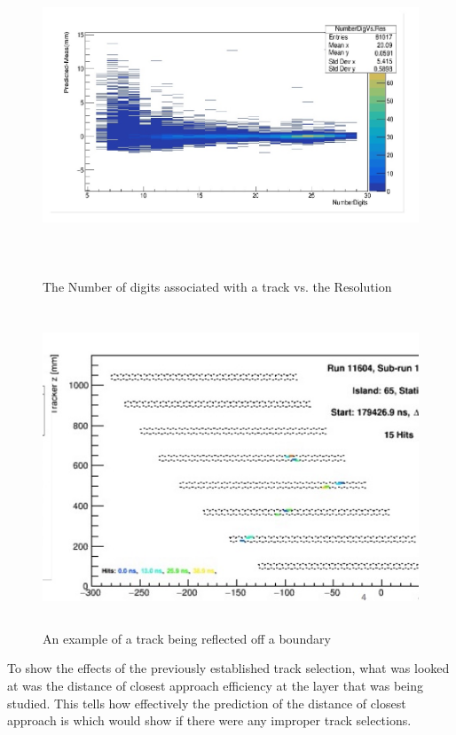 \documentclass[./Thesis]{subfiles}
\begin{document}
\begin{figure}
	\centerline{\includegraphics[height=95mm]{NumDigitsVsRes.jpeg}}
	\caption[Number of Digits vs. Resolution]{ The Number of digits associated with a track vs. the Resolution}
	\label{fig:NumDigits}
\end{figure} 

\begin{figure}
	\centerline{\includegraphics[height=95mm]{ReflectedTrack.jpeg}}
	\caption[Reflected Track]{ An example of a track being reflected off a boundary}
	\label{fig:RefTrack}
\end{figure} 

	 To show the effects of the previously established track selection, what was looked at was the distance of closest approach efficiency at the layer that was being studied. This tells how effectively the prediction of the distance of closest approach is which would show if there were any improper track selections.
\end{document}
